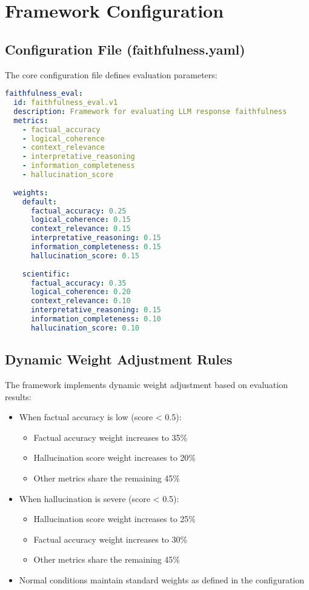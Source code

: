 \section{Framework Configuration}

\subsection{Configuration File (faithfulness.yaml)}
The core configuration file defines evaluation parameters:

\begin{lstlisting}[language=YAML, breaklines=true, basicstyle=\ttfamily\scriptsize]
faithfulness_eval:
  id: faithfulness_eval.v1
  description: Framework for evaluating LLM response faithfulness
  metrics:
    - factual_accuracy
    - logical_coherence
    - context_relevance
    - interpretative_reasoning
    - information_completeness
    - hallucination_score
  
  weights:
    default:
      factual_accuracy: 0.25
      logical_coherence: 0.15
      context_relevance: 0.15
      interpretative_reasoning: 0.15
      information_completeness: 0.15
      hallucination_score: 0.15
    
    scientific:
      factual_accuracy: 0.35
      logical_coherence: 0.20
      context_relevance: 0.10
      interpretative_reasoning: 0.15
      information_completeness: 0.10
      hallucination_score: 0.10
\end{lstlisting}

\subsection{Dynamic Weight Adjustment Rules}
The framework implements dynamic weight adjustment based on evaluation results:

\begin{itemize}
    \item When factual accuracy is low (score < 0.5):
    \begin{itemize}
        \item Factual accuracy weight increases to 35\%
        \item Hallucination score weight increases to 20\%
        \item Other metrics share the remaining 45\%
    \end{itemize}
    
    \item When hallucination is severe (score < 0.5):
    \begin{itemize}
        \item Hallucination score weight increases to 25\%
        \item Factual accuracy weight increases to 30\%
        \item Other metrics share the remaining 45\%
    \end{itemize}
    \item Normal conditions maintain standard weights as defined in the configuration
\end{itemize}

